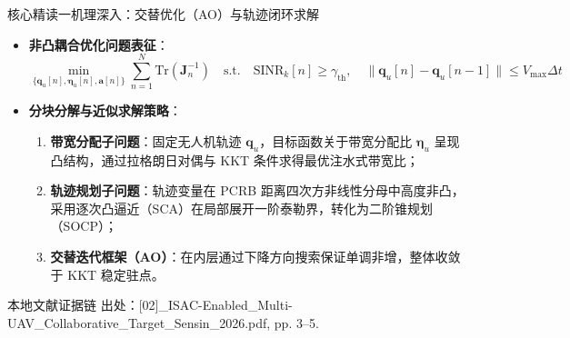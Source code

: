 \documentclass[aspectratio=169, 10pt]{ctexbeamer}
\begin{document}
\begin{frame}{核心精读一机理深入：交替优化（AO）与轨迹闭环求解}
  \begin{itemize}
    \item \textbf{非凸耦合优化问题表征}：
    \begin{equation*}
      \min_{\{\mathbf{q}_u[n], \boldsymbol{\eta}_u[n], \mathbf{a}[n]\}} \sum_{n=1}^N \mathrm{Tr}\left(\mathbf{J}_n^{-1}\right) \quad \text{s.t.} \quad \mathrm{SINR}_{k}[n] \ge \gamma_{\mathrm{th}}, \quad \|\mathbf{q}_u[n] - \mathbf{q}_u[n-1]\| \le V_{\max}\Delta t
    \end{equation*}
    \item \textbf{分块分解与近似求解策略}：
    \begin{enumerate}
      \item \textbf{带宽分配子问题}：固定无人机轨迹 $\mathbf{q}_u$，目标函数关于带宽分配比 $\boldsymbol{\eta}_u$ 呈现凸结构，通过拉格朗日对偶与 KKT 条件求得最优注水式带宽比；
      \item \textbf{轨迹规划子问题}：轨迹变量在 PCRB 距离四次方非线性分母中高度非凸，采用逐次凸逼近（SCA）在局部展开一阶泰勒界，转化为二阶锥规划（SOCP）；
      \item \textbf{交替迭代框架（AO）}：在内层通过下降方向搜索保证单调非增，整体收敛于 KKT 稳定驻点。
    \end{enumerate}
  \end{itemize}

  \begin{block}{本地文献证据链}
    \footnotesize \textcolor{evidencegray}{出处：[02]\_ISAC-Enabled\_Multi-UAV\_Collaborative\_Target\_Sensin\_2026.pdf, pp. 3--5.}
  \end{block}
\end{frame}
\end{document}
